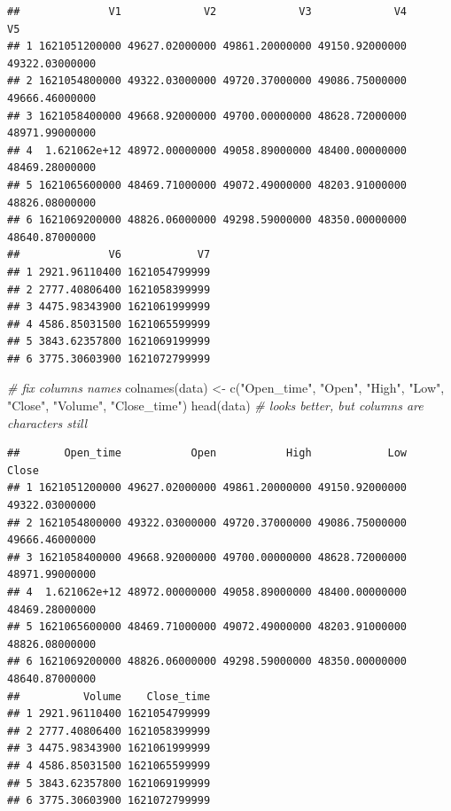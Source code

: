 \documentclass[
]{book}
\newenvironment{Shaded}{\begin{snugshade}}{\end{snugshade}}
\newcommand{\CommentTok}[1]{\textcolor[rgb]{0.56,0.35,0.01}{\textit{#1}}}
\newcommand{\FunctionTok}[1]{\textcolor[rgb]{0.00,0.00,0.00}{#1}}
\newcommand{\NormalTok}[1]{#1}
\newcommand{\OtherTok}[1]{\textcolor[rgb]{0.56,0.35,0.01}{#1}}
\newcommand{\StringTok}[1]{\textcolor[rgb]{0.31,0.60,0.02}{#1}}
\begin{document}
\begin{verbatim}
##              V1             V2             V3             V4             V5
## 1 1621051200000 49627.02000000 49861.20000000 49150.92000000 49322.03000000
## 2 1621054800000 49322.03000000 49720.37000000 49086.75000000 49666.46000000
## 3 1621058400000 49668.92000000 49700.00000000 48628.72000000 48971.99000000
## 4  1.621062e+12 48972.00000000 49058.89000000 48400.00000000 48469.28000000
## 5 1621065600000 48469.71000000 49072.49000000 48203.91000000 48826.08000000
## 6 1621069200000 48826.06000000 49298.59000000 48350.00000000 48640.87000000
##              V6            V7
## 1 2921.96110400 1621054799999
## 2 2777.40806400 1621058399999
## 3 4475.98343900 1621061999999
## 4 4586.85031500 1621065599999
## 5 3843.62357800 1621069199999
## 6 3775.30603900 1621072799999
\end{verbatim}

\begin{Shaded}
\begin{Highlighting}[]
\CommentTok{\# fix columns names}
\FunctionTok{colnames}\NormalTok{(data) }\OtherTok{\textless{}{-}} \FunctionTok{c}\NormalTok{(}\StringTok{"Open\_time"}\NormalTok{, }\StringTok{"Open"}\NormalTok{, }\StringTok{"High"}\NormalTok{, }\StringTok{"Low"}\NormalTok{, }\StringTok{"Close"}\NormalTok{, }\StringTok{"Volume"}\NormalTok{, }\StringTok{"Close\_time"}\NormalTok{)}
\FunctionTok{head}\NormalTok{(data) }\CommentTok{\# looks better, but columns are characters still}
\end{Highlighting}
\end{Shaded}

\begin{verbatim}
##       Open_time           Open           High            Low          Close
## 1 1621051200000 49627.02000000 49861.20000000 49150.92000000 49322.03000000
## 2 1621054800000 49322.03000000 49720.37000000 49086.75000000 49666.46000000
## 3 1621058400000 49668.92000000 49700.00000000 48628.72000000 48971.99000000
## 4  1.621062e+12 48972.00000000 49058.89000000 48400.00000000 48469.28000000
## 5 1621065600000 48469.71000000 49072.49000000 48203.91000000 48826.08000000
## 6 1621069200000 48826.06000000 49298.59000000 48350.00000000 48640.87000000
##          Volume    Close_time
## 1 2921.96110400 1621054799999
## 2 2777.40806400 1621058399999
## 3 4475.98343900 1621061999999
## 4 4586.85031500 1621065599999
## 5 3843.62357800 1621069199999
## 6 3775.30603900 1621072799999
\end{verbatim}
\end{document}
